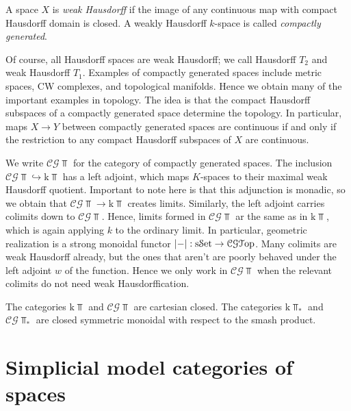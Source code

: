 \begin{definition}\label{dfn:6.2}
	A space $X$ is \emph{weak Hausdorff} if the image of any continuous map with compact Hausdorff domain is closed. A weakly Hausdorff $k$-space is called \emph{compactly generated}.
\end{definition}

Of course, all Hausdorff spaces are weak Hausdorff; we call Hausdorff $T_2$ and weak Hausdorff $T_1$. Examples of compactly generated spaces include metric spaces, CW complexes, and topological manifolds. Hence we obtain many of the important examples in topology. The idea is that the compact Hausdorff subspaces of a compactly generated space determine the topology. In particular, maps $X\to Y$ between compactly generated spaces are continuous if and only if the restriction to any compact Hausdorff subspaces of $X$ are continuous.

We write $\mathcal{C} \mathcal{G} \Top $ for the category of compactly generated spaces. The inclusion $\mathcal{C} \mathcal{G} \Top \hookrightarrow \mathrm{k} \Top $ has a left adjoint, which maps $K$-spaces to their maximal weak Hausdorff quotient. Important to note here is that this adjunction is monadic, so we obtain that $\mathcal{C} \mathcal{G} \Top \to \mathrm{k} \Top $ creates limits. Similarly, the left adjoint carries colimits down to $\mathcal{C} \mathcal{G} \Top $. Hence, limits formed in $\mathcal{C} \mathcal{G} \Top $ ar the same as in $\mathrm{k} \Top $, which is again applying $k$ to the ordinary limit. In particular, geometric realization is a strong monoidal functor $\left| - \right| : \mathrm{s}\mathcal{S}\mathrm{et} \to \mathcal{C} \mathcal{G} \mathcal{T}\mathrm{op} $. Many colimits are weak Hausdorff already, but the ones that aren't are poorly behaved under the left adjoint $w$ of the function. Hence we only work in $\mathcal{C} \mathcal{G} \Top $ when the relevant colimits do not need weak Hausdorffication.

\begin{theorem}\label{thm:6.3}
	The categories $\mathrm{k} \Top $ and $\mathcal{C} \mathcal{G} \Top $ are cartesian closed. The categories $\mathrm{k} \Top_* $ and $\mathcal{C} \mathcal{G} \Top _*$ are closed symmetric monoidal with respect to the smash product.
\end{theorem}

\section{Simplicial model categories of spaces}

